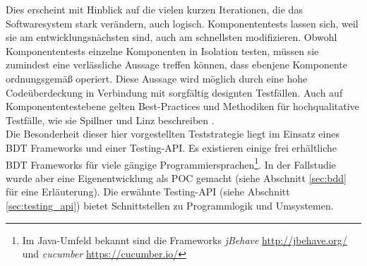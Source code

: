Dies erscheint mit Hinblick auf die vielen kurzen Iterationen, die das Softwaresystem stark verändern, auch logisch. Komponententests lassen sich, weil sie am entwicklungsnächsten sind, auch am schnellsten modifizieren. Obwohl Komponententests einzelne Komponenten in Isolation testen, müssen sie zumindest eine verlässliche Aussage treffen können, dass ebenjene Komponente ordnungsgemäß operiert. Diese Aussage wird möglich durch eine hohe Codeüberdeckung in Verbindung mit sorgfältig designten Testfällen. Auch auf Komponententestebene gelten Best-Practices und Methodiken für hochqualitative Testfälle, wie sie Spillner und Linz beschreiben \cite{spillner_software_2014}.\\
Die Besonderheit dieser hier vorgestellten Teststrategie liegt im Einsatz eines \Gls{BDT} \cite{chelimsky_rspec_2010} Frameworks und einer Testing-API. Es existieren einige frei erhältliche \Gls{BDT} Frameworks für viele gängige Programmiersprachen\footnote{Im Java-Umfeld bekannt sind die Frameworks \textit{jBehave} \url{http://jbehave.org/} und \textit{cucumber} \url{https://cucumber.io/}}. In der Fallstudie wurde aber eine Eigenentwicklung als \Gls{POC} gemacht (siehe Abschnitt \ref{sec:bdd} für eine Erläuterung). Die erwähnte Testing-API (siehe Abschnitt \ref{sec:testing_api}) bietet Schnittstellen zu Programmlogik und Umsystemen.\\
